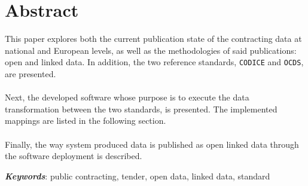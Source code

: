 \addtocounter{page}{-1}

\vspace*{15em}
\section*{Abstract}
    \vspace{0.5cm}
    \begin{adjustwidth}{45pt}{45pt}
        \hspace{15pt} This paper explores both the current publication state of the contracting data at national and European levels, as well as the methodologies of said publications: open and linked data. In addition, the two reference standards, \texttt{CODICE} and \texttt{OCDS}, are presented.
        \\ \\
        \indent Next, the developed software whose purpose is to execute the data transformation between the two standards, is presented. The implemented mappings are listed in the following section.
        \\ \\
        \indent Finally, the way system produced data is published as open linked data through the software deployment is described.
    \end{adjustwidth}
    \vspace{1cm}
    \hspace{0.5cm} \textbf{\textit{Keywords}}: public contracting, tender, open data, linked data, standard

{}

\newpage